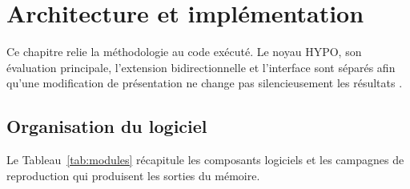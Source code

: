 \chapter{Architecture et implémentation}
\label{chapitre:architecture}

Ce chapitre relie la méthodologie au code exécuté. Le noyau HYPO, son évaluation principale,
l'extension bidirectionnelle et l'interface sont séparés afin qu'une modification de
présentation ne change pas silencieusement les résultats
\citep{sculley2015hidden,amershi2019software,breck2017ml}.

\section{Organisation du logiciel}

Le Tableau~\ref{tab:modules} récapitule les composants logiciels et les campagnes de
reproduction qui produisent les sorties du mémoire.

